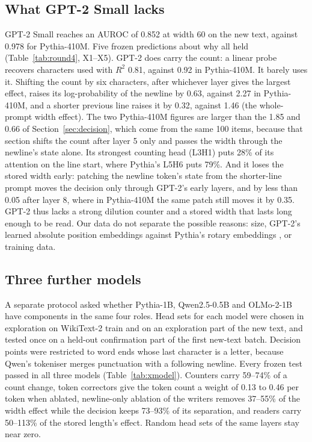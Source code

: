 \documentclass[11pt,a4paper]{article}
\begin{document}
\subsection{What GPT-2 Small lacks}

GPT-2 Small reaches an AUROC of 0.852 at width 60 on the new text, against 0.978 for Pythia-410M. Five frozen predictions about why all held (Table~\ref{tab:round4}, X1--X5). GPT-2 does carry the count: a linear probe recovers characters used with $R^2$ 0.81, against 0.92 in Pythia-410M. It barely uses it. Shifting the count by six characters, after whichever layer gives the largest effect, raises its log-probability of the newline by 0.63, against 2.27 in Pythia-410M, and a shorter previous line raises it by 0.32, against 1.46 (the whole-prompt width effect). The two Pythia-410M figures are larger than the 1.85 and 0.66 of Section~\ref{sec:decision}, which come from the same 100 items, because that section shifts the count after layer 5 only and passes the width through the newline's state alone. Its strongest counting head (L3H1) puts 28\% of its attention on the line start, where Pythia's L5H6 puts 79\%. And it loses the stored width early: patching the newline token's state from the shorter-line prompt moves the decision only through GPT-2's early layers, and by less than 0.05 after layer 8, where in Pythia-410M the same patch still moves it by 0.35. GPT-2 thus lacks a strong dilution counter and a stored width that lasts long enough to be read. Our data do not separate the possible reasons: size, GPT-2's learned absolute position embeddings against Pythia's rotary embeddings \citep{su2024roformer}, or training data.

\subsection{Three further models}
\label{sec:xmodel}

A separate protocol asked whether Pythia-1B, Qwen2.5-0.5B and OLMo-2-1B have components in the same four roles. Head sets for each model were chosen in exploration on WikiText-2 train and on an exploration part of the new text, and tested once on a held-out confirmation part of the first new-text batch. Decision points were restricted to word ends whose last character is a letter, because Qwen's tokeniser merges punctuation with a following newline. Every frozen test passed in all three models (Table~\ref{tab:xmodel}). Counters carry 59--74\% of a count change, token correctors give the token count a weight of 0.13 to 0.46 per token when ablated, newline-only ablation of the writers removes 37--55\% of the width effect while the decision keeps 73--93\% of its separation, and readers carry 50--113\% of the stored length's effect. Random head sets of the same layers stay near zero.
\end{document}
